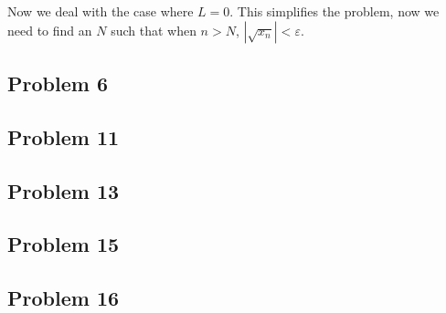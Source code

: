 \documentclass[11pt]{article}
\begin{document}
Now we deal with the case where $L=0$. This simplifies the problem, now
we need to find an $N$ such that when $n > N$, $\left|\sqrt{x_n}\right|< \varepsilon$.

\subsection*{Problem 6}
\subsection*{Problem 11}
\subsection*{Problem 13}
\subsection*{Problem 15}
\subsection*{Problem 16}
\end{document}
